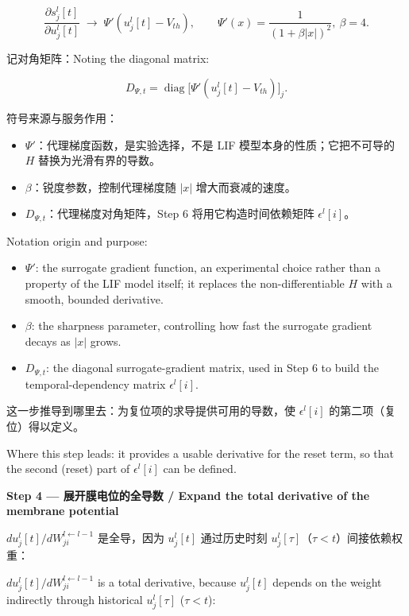 \documentclass[journal,12pt,onecolumn]{IEEEtran}
\begin{document}
\begin{equation}
\frac{\partial s_j^l[t]}{\partial u_j^l[t]} \;\to\; \Psi'(u_j^l[t] - V_{th}), \qquad \Psi'(x)=\frac{1}{(1+\beta|x|)^2},\ \beta=4.
\end{equation}

记对角矩阵：Noting the diagonal matrix:

\begin{equation}
D_{\Psi,t} = \operatorname{diag}\!\big[\Psi'(u_j^l[t] - V_{th})\big]_j.
\end{equation}

符号来源与服务作用：
\begin{itemize}[leftmargin=1.5em,itemsep=2pt]
\item $\Psi'$：代理梯度函数，是实验选择，不是 LIF 模型本身的性质；它把不可导的 $H$ 替换为光滑有界的导数。
\item $\beta$：锐度参数，控制代理梯度随 $|x|$ 增大而衰减的速度。
\item $D_{\Psi,t}$：代理梯度对角矩阵，Step 6 将用它构造时间依赖矩阵 $\epsilon^l[i]$。
\end{itemize}

Notation origin and purpose:
\begin{itemize}[leftmargin=1.5em,itemsep=2pt]
\item $\Psi'$: the surrogate gradient function, an experimental choice rather than a property of the LIF model itself; it replaces the non-differentiable $H$ with a smooth, bounded derivative.
\item $\beta$: the sharpness parameter, controlling how fast the surrogate gradient decays as $|x|$ grows.
\item $D_{\Psi,t}$: the diagonal surrogate-gradient matrix, used in Step 6 to build the temporal-dependency matrix $\epsilon^l[i]$.
\end{itemize}

这一步推导到哪里去：为复位项的求导提供可用的导数，使 $\epsilon^l[i]$ 的第二项（复位）得以定义。

Where this step leads: it provides a usable derivative for the reset term, so that the second (reset) part of $\epsilon^l[i]$ can be defined.

\medskip\noindent\textbf{Step 4 — 展开膜电位的全导数 / Expand the total derivative of the membrane potential}

$du_j^l[t]/dW_{ji}^{l\leftarrow l-1}$ 是全导，因为 $u_j^l[t]$ 通过历史时刻 $u_j^l[\tau]$（$\tau<t$）间接依赖权重：

$du_j^l[t]/dW_{ji}^{l\leftarrow l-1}$ is a total derivative, because $u_j^l[t]$ depends on the weight indirectly through historical $u_j^l[\tau]$ ($\tau<t$):
\end{document}
